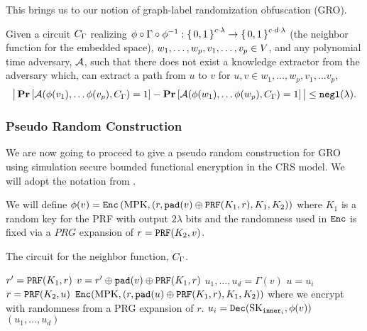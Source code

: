 This brings us to our notion of graph-label randomization obfuscation (GRO).

\begin{definition}
	Given a circuit $C_\Gamma$ realizing $\phi \circ \Gamma \circ \phi^{-1}: \set{0, 1}^{c \cdot \lambda} \rightarrow \set{0, 1}^{c \cdot d \cdot \lambda}$ (the neighbor function for the embedded space),
	$w_1, \dots, w_p, v_1, \dots, v_p \in V$, and any polynomial time adversary, $\mathcal{A}$, such that there does not exist a knowledge extractor from the adversary which,
	can extract a path from $u$ to $v$ for $u, v \in w_1, \dots, w_p, v_1, \dots v_p$,
	\begin{equation}
	\label{eq:gameGRO}
	\big|
		\operatorname*{\mathbf{Pr}}\left[\mathcal{A}(\phi(v_1), \dots \phi(v_{p}), C_\Gamma) = 1\right]
		 - 
		\operatorname*{\mathbf{Pr}}\left[\mathcal{A}(\phi(w_1), \dots \phi(w_{p}), C_\Gamma) = 1\right]
	\big|
		\leq \texttt{negl}(\lambda).
	\end{equation}
\end{definition}

\subsubsection*{Pseudo Random Construction}
We are now going to proceed to give a pseudo random construction for GRO using simulation secure bounded functional encryption in the CRS model.
We will adopt the notation from \cite{ananth2019optimal}.

We will define $\phi(v) = \texttt{Enc}\left(\text{MPK}, (r, \texttt{pad}(v) \oplus \texttt{PRF}(K_1, r), K_1, K_2)\right)$ where $K_1$ is a random key for the PRF with output $2 \lambda$ bits
and the randomness used in $\texttt{Enc}$ is fixed via a $PRG$ expansion of $r = \texttt{PRF}(K_2, v)$.

\begin{algorithm}[H]
	\caption{
		The circuit for the neighbor function, $C_\Gamma$.
	}
	\begin{algorithmic}[1]
			\State $r' = \texttt{PRF}(K_1, r)$
			\State $v = r' \oplus \texttt{pad}(v) \oplus \texttt{PRF}(K_1, r)$
			\State $u_1, \dots, u_d = \Gamma(v)$
			\State $u = u_i$
			\State $r = \texttt{PRF}(K_2, u)$
			\State \Return $\texttt{Enc}(\text{MPK}, (r, \texttt{pad}(u) \oplus \texttt{PRF}(K_1, r), K_1, K_2))$ where we encrypt with randomness from a PRG expansion of $r$.
		\EndFunction
				\State $u_i = \texttt{Dec}(\text{SK}_{\texttt{inner}_i}, \phi(v))$
			\EndFor
			\State \Return $(u_1, \dots, u_d)$
		\EndFunction
	\end{algorithmic}
\end{algorithm}

